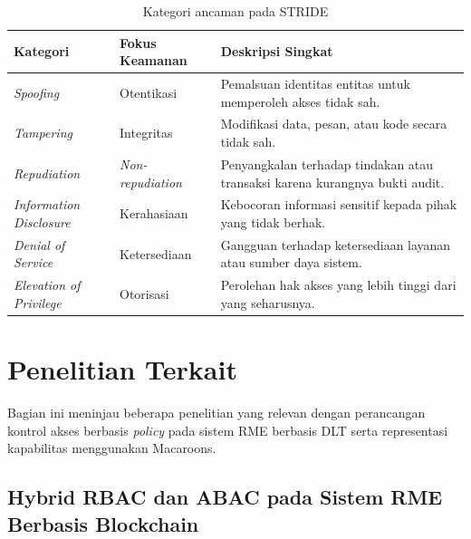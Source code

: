\documentclass[bahasa, 12pt, a4paper, onecolumn, oneside, final]{report}
\begin{document}
\begin{table}[ht]
	\centering
	\caption{Kategori ancaman pada STRIDE}
	\label{tab:stride-components}
	\begin{tabularx}{\textwidth}{|l|l|X|}
		\hline
		\textbf{Kategori}               & \textbf{Fokus Keamanan} & \textbf{Deskripsi Singkat} \\
		\hline
		\textit{Spoofing}               &
		Otentikasi                      &
		Pemalsuan identitas entitas untuk memperoleh akses tidak sah.                          \\
		\hline

		\textit{Tampering}              &
		Integritas                      &
		Modifikasi data, pesan, atau kode secara tidak sah.                                    \\
		\hline

		\textit{Repudiation}            &
		\textit{Non-repudiation}        &
		Penyangkalan terhadap tindakan atau transaksi karena kurangnya bukti audit.            \\
		\hline

		\textit{Information Disclosure} &
		Kerahasiaan                     &
		Kebocoran informasi sensitif kepada pihak yang tidak berhak.                           \\
		\hline

		\textit{Denial of Service}      &
		Ketersediaan                    &
		Gangguan terhadap ketersediaan layanan atau sumber daya sistem.                        \\
		\hline

		\textit{Elevation of Privilege} &
		Otorisasi                       &
		Perolehan hak akses yang lebih tinggi dari yang seharusnya.                            \\
		\hline
	\end{tabularx}
\end{table}
\section{Penelitian Terkait}
\label{sec:penelitian-terkait}

\noindent Bagian ini meninjau beberapa penelitian yang relevan dengan perancangan kontrol akses berbasis \textit{policy} pada sistem RME berbasis DLT serta representasi kapabilitas menggunakan Macaroons.

\subsection{Hybrid RBAC dan ABAC pada Sistem RME Berbasis Blockchain}
\label{subsec:hybrid-rbac-abac}
\end{document}
